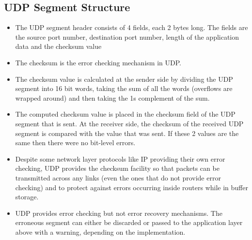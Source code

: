\documentclass{article}
\theoremstyle{plain}
\theoremstyle{definition}
\begin{document}
\subsection{UDP Segment Structure}
\begin{itemize}
    \item The UDP segment header consists of 4 fields, each 2 bytes long. The fields are the source port number, destination port number, length of the application data and the checksum value
    
    \item The checksum is the error checking mechanism in UDP.
    
    \item The checksum value is calculated at the sender side by dividing the UDP segment into 16 bit words, taking the sum of all the words (overflows are wrapped around) and then taking the 1s complement of the sum. 
    
    \item The computed checksum value is placed in the checksum field of the UDP segment that is sent. At the receiver side, the checksum of the received UDP segment is compared with the value that was sent. If these 2 values are the same then there were no bit-level errors. 
    
    \item Despite some network layer protocols like IP providing their own error checking, UDP provides the checksum facility so that packets can be transmitted across any links (even the ones that do not provide error checking) and to protect against errors occurring inside routers while in buffer storage. 
    
    \item UDP provides error checking but not error recovery mechanisms. The erroneous segment can either be discarded or passed to the application layer above with a warning, depending on the implementation.
\end{itemize}
\end{document}
